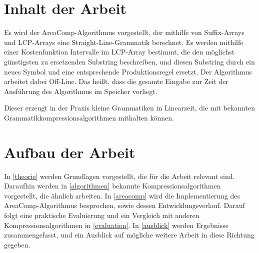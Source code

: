 \section{Inhalt der Arbeit}

Es wird der AreaComp-Algorithmus vorgestellt, der mithilfe von Suffix-Arrays und LCP-Arrays \cite{manber_suffix_1993} eine Straight-Line-Grammatik berechnet. Es werden mithilfe einer Kostenfunktion Intervalle im LCP-Array bestimmt, die den möglichst günstigsten zu ersetzenden Substring beschreiben, und diesen Substring durch ein neues Symbol und eine entsprechende Produktionsregel ersetzt.
Der Algorithmus arbeitet dabei Off-Line. Das heißt, dass die gesamte Eingabe zur Zeit der Ausführung des Algorithmus im Speicher vorliegt.

Dieser erzeugt in der Praxis kleine Grammatiken in Linearzeit, die mit bekannten Grammatikkompressionsalgorithmen mithalten können.

\section{Aufbau der Arbeit}

In \autoref{theorie} werden Grundlagen vorgestellt, die für die Arbeit relevant sind. Daraufhin werden in \autoref{algorithmen} bekannte Kompressionsalgorithmen vorgestellt, die ähnlich arbeiten. In \autoref{areacomp} wird die Implementierung des AreaComp-Algorithmus besprochen, sowie dessen Entwicklungsverlauf. Darauf folgt eine praktische Evaluierung und ein Vergleich mit anderen Kompressionsalgorithmen in \autoref{evaluation}. In \autoref{ausblick} werden Ergebnisse zusammengefasst, und ein Ausblick auf mögliche weitere Arbeit in diese Richtung gegeben.